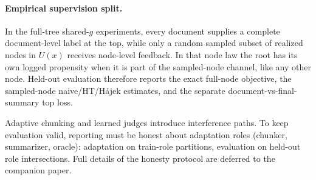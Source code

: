 \paragraph{Empirical supervision split.}
In the full-tree shared-$g$ experiments, every document supplies a complete document-level label at the top, while only a random sampled subset of realized nodes in $U(x)$ receives node-level feedback. In that node law the root has its own logged propensity when it is part of the sampled-node channel, like any other node. Held-out evaluation therefore reports the exact full-node objective, the sampled-node naive/HT/H\'ajek estimates, and the separate document-vs-final-summary top loss.

Adaptive chunking and learned judges introduce interference paths. To keep evaluation valid, reporting must be honest about adaptation roles (chunker, summarizer, oracle): adaptation on train-role partitions, evaluation on held-out role intersections. Full details of the honesty protocol are deferred to the companion paper.
